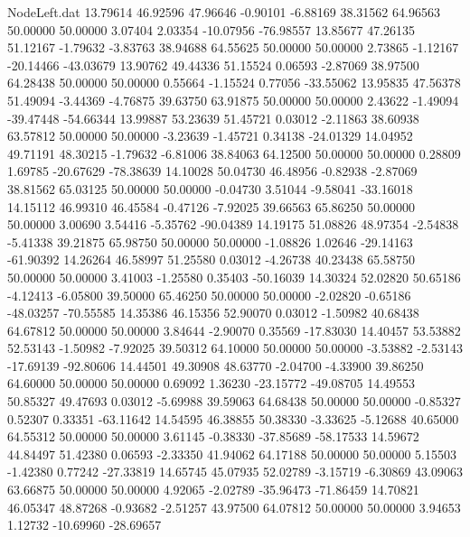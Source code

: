 \begin{filecontents}{NodeLeft.dat}
  13.79614   46.92596   47.96646    -0.90101   -6.88169   38.31562   64.96563   50.00000   50.00000    3.07404    2.03354  -10.07956  -76.98557
  13.85677   47.26135   51.12167    -1.79632   -3.83763   38.94688   64.55625   50.00000   50.00000    2.73865   -1.12167  -20.14466  -43.03679
  13.90762   49.44336   51.15524     0.06593   -2.87069   38.97500   64.28438   50.00000   50.00000    0.55664   -1.15524    0.77056  -33.55062
  13.95835   47.56378   51.49094    -3.44369   -4.76875   39.63750   63.91875   50.00000   50.00000    2.43622   -1.49094  -39.47448  -54.66344
  13.99887   53.23639   51.45721     0.03012   -2.11863   38.60938   63.57812   50.00000   50.00000   -3.23639   -1.45721    0.34138  -24.01329
  14.04952   49.71191   48.30215    -1.79632   -6.81006   38.84063   64.12500   50.00000   50.00000    0.28809    1.69785  -20.67629  -78.38639
  14.10028   50.04730   46.48956    -0.82938   -2.87069   38.81562   65.03125   50.00000   50.00000   -0.04730    3.51044   -9.58041  -33.16018
  14.15112   46.99310   46.45584    -0.47126   -7.92025   39.66563   65.86250   50.00000   50.00000    3.00690    3.54416   -5.35762  -90.04389
  14.19175   51.08826   48.97354    -2.54838   -5.41338   39.21875   65.98750   50.00000   50.00000   -1.08826    1.02646  -29.14163  -61.90392
  14.26264   46.58997   51.25580     0.03012   -4.26738   40.23438   65.58750   50.00000   50.00000    3.41003   -1.25580    0.35403  -50.16039
  14.30324   52.02820   50.65186    -4.12413   -6.05800   39.50000   65.46250   50.00000   50.00000   -2.02820   -0.65186  -48.03257  -70.55585
  14.35386   46.15356   52.90070     0.03012   -1.50982   40.68438   64.67812   50.00000   50.00000    3.84644   -2.90070    0.35569  -17.83030
  14.40457   53.53882   52.53143    -1.50982   -7.92025   39.50312   64.10000   50.00000   50.00000   -3.53882   -2.53143  -17.69139  -92.80606
  14.44501   49.30908   48.63770    -2.04700   -4.33900   39.86250   64.60000   50.00000   50.00000    0.69092    1.36230  -23.15772  -49.08705
  14.49553   50.85327   49.47693     0.03012   -5.69988   39.59063   64.68438   50.00000   50.00000   -0.85327    0.52307    0.33351  -63.11642
  14.54595   46.38855   50.38330    -3.33625   -5.12688   40.65000   64.55312   50.00000   50.00000    3.61145   -0.38330  -37.85689  -58.17533
  14.59672   44.84497   51.42380     0.06593   -2.33350   41.94062   64.17188   50.00000   50.00000    5.15503   -1.42380    0.77242  -27.33819
  14.65745   45.07935   52.02789    -3.15719   -6.30869   43.09063   63.66875   50.00000   50.00000    4.92065   -2.02789  -35.96473  -71.86459
  14.70821   46.05347   48.87268    -0.93682   -2.51257   43.97500   64.07812   50.00000   50.00000    3.94653    1.12732  -10.69960  -28.69657

\end{filecontents}
